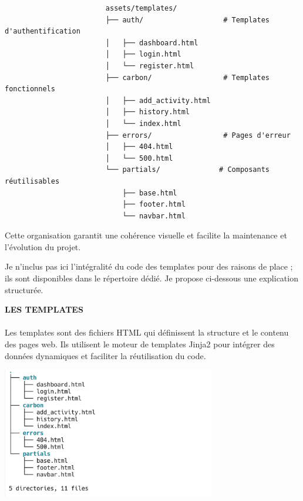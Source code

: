 \documentclass[a4paper,11pt]{article}
\begin{document}
                \begin{tcolorbox}[colback=lightgray!6, colframe=black, left=-35mm, right=5mm, top=2mm, bottom=0mm, boxrule=0.1mm]
                    \begin{verbatim}
                        assets/templates/
                        ├── auth/                   # Templates d'authentification
                        │   ├── dashboard.html
                        │   ├── login.html
                        │   └── register.html
                        ├── carbon/                 # Templates fonctionnels
                        │   ├── add_activity.html
                        │   ├── history.html
                        │   └── index.html
                        ├── errors/                 # Pages d'erreur
                        │   ├── 404.html
                        │   └── 500.html
                        └── partials/              # Composants réutilisables
                            ├── base.html
                            ├── footer.html
                            └── navbar.html
                    \end{verbatim}
                \end{tcolorbox}

                \noindent Cette organisation garantit une cohérence visuelle et facilite la maintenance et l'évolution du projet.

                \noindent Je n'inclus pas ici l'intégralité du code des templates pour des raisons de place ; ils sont disponibles dans le répertoire dédié. Je propose ci-dessous une explication structurée.

            \bigskip
            \textbf{LES TEMPLATES}\\\\
            \noindent Les templates sont des fichiers HTML qui définissent la structure et le contenu des pages web. Ils utilisent le moteur de templates Jinja2 pour intégrer des données dynamiques et faciliter la réutilisation du code.

            \begin{center}
                \includegraphics[width=0.7\textwidth]{captures/templates_et_static/img1.png}
            \end{center}
\end{document}
